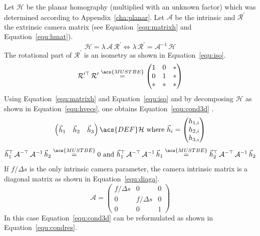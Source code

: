 \documentclass[12pt,a4paper,oneside,openright]{book}
\newcommand{\equ}[1]{Equation~\ref{equ:#1}}
\newcommand{\anx}[1]{Appendix~\ref{cha:#1}}
\begin{document}
\begin{CJK}{UTF8}{}
Let $\mathcal{H}$ be the planar homography (multiplied with an unknown factor) which was determined according to \anx{planar}. Let $\mathcal{A}$ be the intrinsic and $\mathcal{R}^\prime$ the extrinsic camera matrix (see \equ{matrixh} and \equ{hmat}).
\begin{equation}\label{equ:matrixh}
  \mathcal{H}=\lambda\,\mathcal{A}\,\mathcal{R}^\prime\Leftrightarrow\lambda\,\mathcal{R}^\prime=\mathcal{A}^{-1}\,\mathcal{H}
\end{equation}
The rotational part of $\mathcal{R}^\prime$ is an isometry as shown in \equ{iso}.
\begin{equation}\label{equ:iso}
  \mathcal{R}^{\prime\top}\,\mathcal{R}^\prime\overset{\acs{MUSTBE}}{=}\begin{pmatrix}1&0&\ast\\0&1&\ast\\\ast&\ast&\ast\end{pmatrix}
\end{equation}
Using \equ{matrixh} and \equ{iso} and by decomposing $\mathcal{H}$ as shown in \equ{hvecs}, one obtains \equ{cond3d} \citep{zhang2000flexible}.
\begin{equation}\label{equ:hvecs}
  \begin{pmatrix}\vec{h}_1&\vec{h}_2&\vec{h}_3\end{pmatrix}\acs{DEF}\mathcal{H}\mathrm{\ where\ }\vec{h}_i=\begin{pmatrix}h_{1,i}\\h_{2,i}\\h_{3,i}\end{pmatrix}
\end{equation}
\begin{equation}\label{equ:cond3d}
  \vec{h}_1^\top\,\mathcal{A}^{-\top}\,\mathcal{A}^{-1}\,\vec{h}_2\overset{\acs{MUSTBE}}{=}0\mathrm{\ and\ }\vec{h}_1^\top\,\mathcal{A}^{-\top}\,\mathcal{A}^{-1}\,\vec{h}_1\overset{\acs{MUSTBE}}{=}\vec{h}_2^\top\,\mathcal{A}^{-\top}\,\mathcal{A}^{-1}\,\vec{h}_2
\end{equation}
If $f/\Delta s$ is the only intrinsic camera parameter, the camera intrinsic matrix is a diagonal matrix as shown in \equ{diaga}.
\begin{equation}\label{equ:diaga}
  \mathcal{A}=\begin{pmatrix}f/\Delta s&0&0\\0&f/\Delta s&0\\0&0&1\end{pmatrix}
\end{equation}
In this case \equ{cond3d} can be reformulated as shown in \equ{condres}.

\end{CJK}
\end{document}
